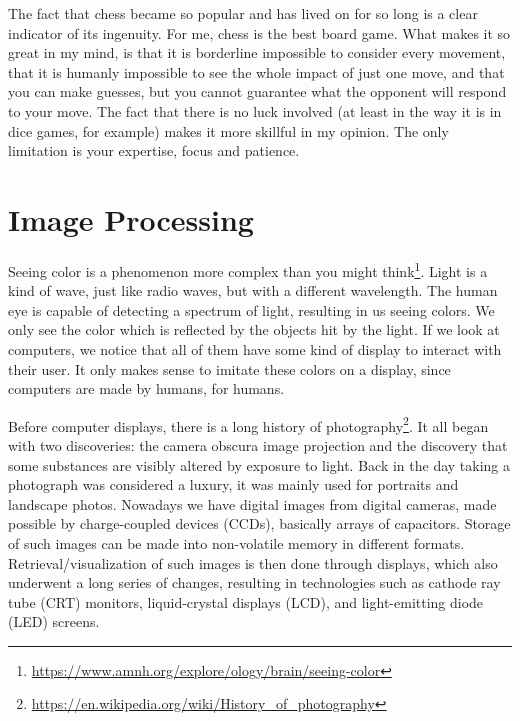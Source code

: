 The fact that chess became so popular and has lived on for so long is a clear indicator of its ingenuity. For me, chess is the best board game. What makes it so great in my mind, is that it is borderline impossible to consider every movement, that it is humanly impossible to see the whole impact of just one move, and that you can make guesses, but you cannot guarantee what the opponent will respond to your move. The fact that there is no luck involved (at least in the way it is in dice games, for example) makes it more skillful in my opinion. The only limitation is your expertise, focus and patience. 




\section{Image Processing}

Seeing color is a phenomenon more complex than you might think\footnote{\url{https://www.amnh.org/explore/ology/brain/seeing-color}}. Light is a kind of wave, just like radio waves, but with a different wavelength. The human eye is capable of detecting a spectrum of light, resulting in us seeing colors. We only see the color which is reflected by the objects hit by the light. If we look at computers, we notice that all of them have some kind of display to interact with their user. It only makes sense to imitate these colors on a display, since computers are made by humans, for humans.

Before computer displays, there is a long history of photography\footnote{\url{https://en.wikipedia.org/wiki/History_of_photography}}. It all began with two discoveries: the camera obscura image projection and the discovery that some substances are visibly altered by exposure to light. Back in the day taking a photograph was considered a luxury, it was mainly used for portraits and landscape photos. Nowadays we have digital images from digital cameras, made possible by charge-coupled devices (CCDs), basically arrays of capacitors. Storage of such images can be made into non-volatile memory in different formats. Retrieval/visualization of such images is then done through displays, which also underwent a long series of changes, resulting in technologies such as cathode ray tube (CRT) monitors, liquid-crystal displays (LCD), and light-emitting diode (LED) screens.


